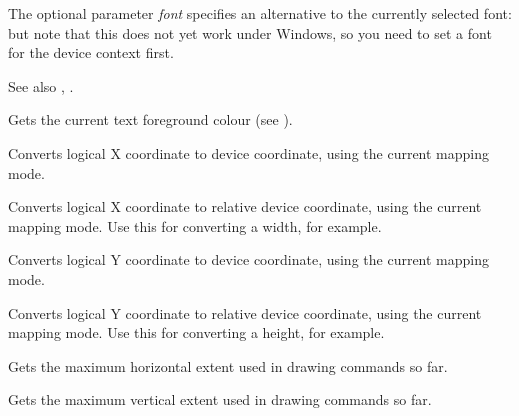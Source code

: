 The optional parameter {\it font} specifies an alternative
to the currently selected font: but note that this does not
yet work under Windows, so you need to set a font for
the device context first.

See also , .

\label{wxdcgettextforeground}


Gets the current text foreground colour (see ).

\label{wxdclogicaltodevicex}


Converts logical X coordinate to device coordinate, using the current
mapping mode.

\label{wxdclogicaltodevicexrel}


Converts logical X coordinate to relative device coordinate, using the current
mapping mode. Use this for converting a width, for example.

\label{wxdclogicaltodevicey}


Converts logical Y coordinate to device coordinate, using the current
mapping mode.

\label{wxdclogicaltodeviceyrel}


Converts logical Y coordinate to relative device coordinate, using the current
mapping mode. Use this for converting a height, for example.

\label{wxdcmaxx}


Gets the maximum horizontal extent used in drawing commands so far.

\label{wxdcmaxy}


Gets the maximum vertical extent used in drawing commands so far.

